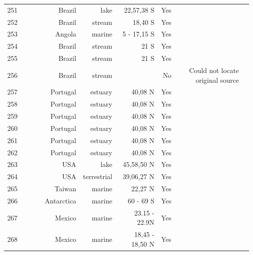\documentclass[12pt]{article}
\begin{document}
\begin{landscape}
\begin{table}[h!]
\begin{tabular}{rrrrrrrrr}
      251   & ~\citet{GlobalWeb} & ~\citet{Angelini2006} & Brazil & lake  & 22,57,38 S & Yes   &       &  \\
      252   & ~\citet{GlobalWeb} & ~\citet{Angelini2010} & Brazil & stream & 18,40 S & Yes   &       &  \\
      253   & ~\citet{GlobalWeb} & ~\citet{Angelini2011} & Angola & marine & 5 - 17,15 S & Yes   &       &  \\
      254   & ~\citet{GlobalWeb} & ~\citet{Angelini2013} & Brazil & stream & 21 S  & Yes   &       &  \\
      255   & ~\citet{GlobalWeb} & ~\citet{Angelini2013} & Brazil & stream & 21 S  & Yes   &       &  \\
      256   & ~\citet{GlobalWeb} & ~\citet{Angelini2013} & Brazil & stream &       & No    & Could not locate original source &  \\
      257   & ~\citet{GlobalWeb} & ~\citet{Baeta2011} & Portugal & estuary & 40,08 N & Yes   &       &  \\
      258   & ~\citet{GlobalWeb} & ~\citet{Baeta2011} & Portugal & estuary & 40,08 N & Yes   &       &  \\
      259   & ~\citet{GlobalWeb} & ~\citet{Baeta2011} & Portugal & estuary & 40,08 N & Yes   &       &  \\
      260   & ~\citet{GlobalWeb} & ~\citet{Baeta2011} & Portugal & estuary & 40,08 N & Yes   &       &  \\
      261   & ~\citet{GlobalWeb} & ~\citet{Baeta2011} & Portugal & estuary & 40,08 N & Yes   &       &  \\
      262   & ~\citet{GlobalWeb} & ~\citet{Baeta2011} & Portugal & estuary & 40,08 N & Yes   &       &  \\
      263   & ~\citet{GlobalWeb} & ~\citet{Schnieder1997} & USA   & lake  & 45,58,50 N & Yes   &       &  \\
      264   & ~\citet{GlobalWeb} & ~\citet{Stagliano2002} & USA   & terrestrial & 39,06,27 N & Yes   &       &  \\
      265   & ~\citet{GlobalWeb} & ~\citet{Lin2006} & Taiwan & marine & 22,27 N & Yes   &       &  \\
      266   & ~\citet{GlobalWeb} & ~\citet{Cornejo-Donoso2008} & Antarctica & marine & 60 - 69 S & Yes   &       &  \\
      267   & ~\citet{GlobalWeb} & ~\citet{Zetina-Rejon2003} & Mexico & marine & 23.15 - 22.9N & Yes   &       &  \\
      268   & ~\citet{GlobalWeb} & ~\citet{Cruz-Escalona2007} & Mexico & marine & 18,45 - 18,50 N & Yes   &       &  \\

\end{tabular}
\end{table}
\end{landscape}
\end{document}

